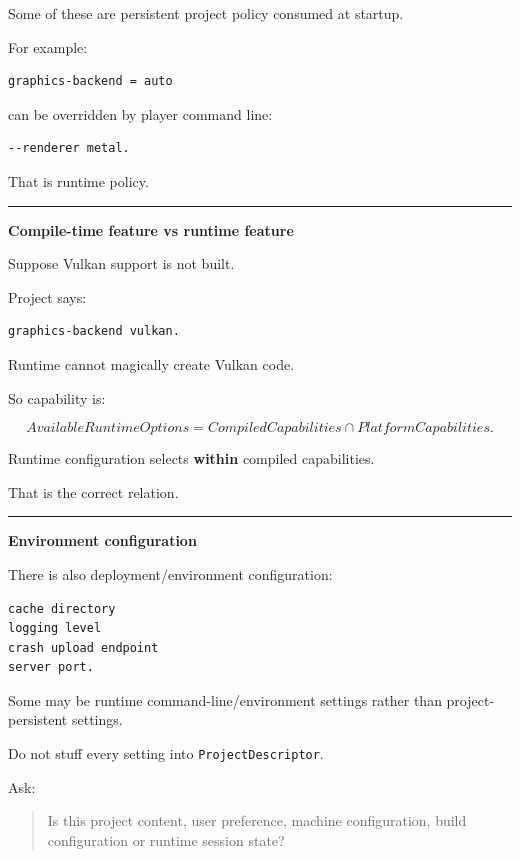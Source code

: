 Some of these are persistent project policy consumed at startup.

For example:

\begin{verbatim}
graphics-backend = auto
\end{verbatim}

can be overridden by player command line:

\begin{verbatim}
--renderer metal.
\end{verbatim}

That is runtime policy.

\begin{center}\rule{0.5\linewidth}{0.5pt}\end{center}

\textbf{Compile-time feature vs runtime feature}

Suppose Vulkan support is not built.

Project says:

\begin{verbatim}
graphics-backend vulkan.
\end{verbatim}

Runtime cannot magically create Vulkan code.

So capability is:

\[
AvailableRuntimeOptions
=
CompiledCapabilities
\cap
PlatformCapabilities.
\]

Runtime configuration selects \textbf{within} compiled capabilities.

That is the correct relation.

\begin{center}\rule{0.5\linewidth}{0.5pt}\end{center}

\textbf{Environment configuration}

There is also deployment/environment configuration:

\begin{verbatim}
cache directory
logging level
crash upload endpoint
server port.
\end{verbatim}

Some may be runtime command-line/environment settings rather than project-persistent settings.

Do not stuff every setting into \texttt{ProjectDescriptor}.

Ask:

\begin{quote}
Is this project content, user preference, machine configuration, build configuration or runtime session state?
\end{quote}

